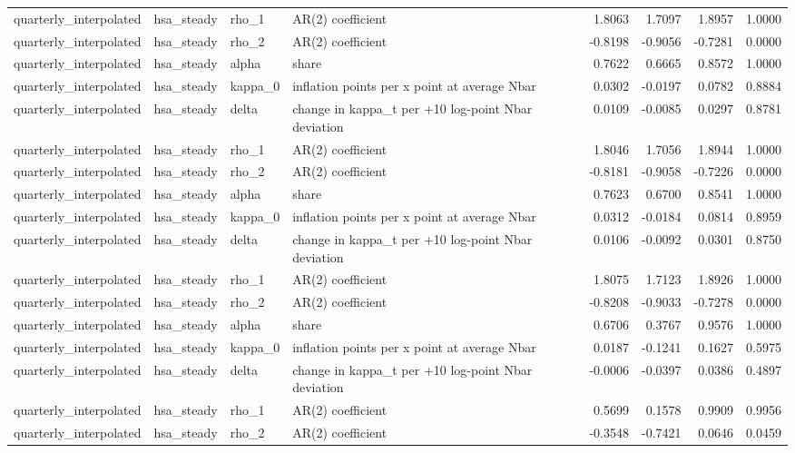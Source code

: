 \begin{tabular}{llllrrrr}
quarterly\_interpolated & hsa\_steady & rho\_1 & AR(2) coefficient & 1.8063 & 1.7097 & 1.8957 & 1.0000 \\
quarterly\_interpolated & hsa\_steady & rho\_2 & AR(2) coefficient & -0.8198 & -0.9056 & -0.7281 & 0.0000 \\
quarterly\_interpolated & hsa\_steady & alpha & share & 0.7622 & 0.6665 & 0.8572 & 1.0000 \\
quarterly\_interpolated & hsa\_steady & kappa\_0 & inflation points per x point at average Nbar & 0.0302 & -0.0197 & 0.0782 & 0.8884 \\
quarterly\_interpolated & hsa\_steady & delta & change in kappa\_t per +10 log-point Nbar deviation & 0.0109 & -0.0085 & 0.0297 & 0.8781 \\
quarterly\_interpolated & hsa\_steady & rho\_1 & AR(2) coefficient & 1.8046 & 1.7056 & 1.8944 & 1.0000 \\
quarterly\_interpolated & hsa\_steady & rho\_2 & AR(2) coefficient & -0.8181 & -0.9058 & -0.7226 & 0.0000 \\
quarterly\_interpolated & hsa\_steady & alpha & share & 0.7623 & 0.6700 & 0.8541 & 1.0000 \\
quarterly\_interpolated & hsa\_steady & kappa\_0 & inflation points per x point at average Nbar & 0.0312 & -0.0184 & 0.0814 & 0.8959 \\
quarterly\_interpolated & hsa\_steady & delta & change in kappa\_t per +10 log-point Nbar deviation & 0.0106 & -0.0092 & 0.0301 & 0.8750 \\
quarterly\_interpolated & hsa\_steady & rho\_1 & AR(2) coefficient & 1.8075 & 1.7123 & 1.8926 & 1.0000 \\
quarterly\_interpolated & hsa\_steady & rho\_2 & AR(2) coefficient & -0.8208 & -0.9033 & -0.7278 & 0.0000 \\
quarterly\_interpolated & hsa\_steady & alpha & share & 0.6706 & 0.3767 & 0.9576 & 1.0000 \\
quarterly\_interpolated & hsa\_steady & kappa\_0 & inflation points per x point at average Nbar & 0.0187 & -0.1241 & 0.1627 & 0.5975 \\
quarterly\_interpolated & hsa\_steady & delta & change in kappa\_t per +10 log-point Nbar deviation & -0.0006 & -0.0397 & 0.0386 & 0.4897 \\
quarterly\_interpolated & hsa\_steady & rho\_1 & AR(2) coefficient & 0.5699 & 0.1578 & 0.9909 & 0.9956 \\
quarterly\_interpolated & hsa\_steady & rho\_2 & AR(2) coefficient & -0.3548 & -0.7421 & 0.0646 & 0.0459 \\

\end{tabular}
